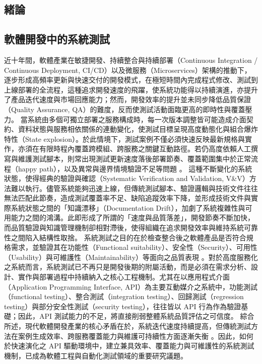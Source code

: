 \begin{ZhChapter}

\chapter{緒論}

\section{軟體開發中的系統測試}
\text 近十年間，軟體產業在敏捷開發、持續整合與持續部署（Continuous Integration / Continuous Deployment, CI/CD）以及微服務（Microservices）架構的推動下，逐步形成高頻率更新與快速交付的開發模式，在極短時間內完成程式修改、測試到上線部署的全流程，這種追求開發速度的飛躍，使系統功能得以持續演進，亦提升了產品迭代速度與市場回應能力\parencite{Bajaj2019SystematicReviewTCP}；然而，開發效率的提升並未同步降低品質保證（Quality Assurance, QA）的難度，反而使測試活動面臨更高的即時性與覆蓋壓力。
\text 當系統由多個可獨立部署之服務構成時，每一次版本調整皆可能造成介面契約、資料狀態與服務相依關係的連動變化，使測試目標呈現高度動態化與組合爆炸特性（State explosion）。於此情境下，測試案例不僅必須快速反映最新規格與實作，亦須在有限時程內覆蓋跨模組、跨服務之關鍵互動路徑。若仍高度依賴人工撰寫與維護測試腳本，則常出現測試更新速度落後部署節奏、覆蓋範圍集中於正常流程（happy path），以及異常與邊界情境驗證不足等問題 \parencite{Bajaj2019SystematicReviewTCP}。
\text 這種不斷變化的系統狀態，使得經典的驗證與確認（Systematic Verification and Validation, V\&V）方法難以執行。儘管系統能夠迅速上線，但傳統測試腳本、驗證邏輯與技術文件往往無法匹配此節奏，造成測試覆蓋率不足、缺陷追蹤效率下降，並形成技術文件與實際系統狀態之間的「知識漂移」（Documentation Drift），加劇了系統複雜性與可用能力之間的鴻溝。此即形成了所謂的「速度與品質落差」，開發節奏不斷加快，而品質驗證與知識管理機制卻相對滯後，使得組織在追求開發效率與維持系統可靠性之間陷入結構性取捨。
\text 系統測試之目的在於檢查整合後之軟體產品是否符合規格需求，並驗證其在功能性（Functional suitability）、安全性（Security）、可用性（Usability）與可維護性（Maintainability）等面向之品質表現 \parencite{TestingSoftwareSystems}。對於高度服務化之系統而言，系統測試已不再只是開發後期的附屬活動，而是必須在需求分析、設計、實作與部署過程中持續納入之核心工程機制。尤其在以應用程式介面（Application Programming Interface, API）為主要互動媒介之系統中，功能測試（functional testing）、整合測試（integration testing）、回歸測試（regression testing）與部分安全性測試（security testing），往往皆以 API 行為作為驗證基礎；因此，API 測試能力的不足，將直接削弱整體系統品質評估之可信度。
\text 綜合所述，現代軟體開發產業的核心矛盾在於，系統迭代速度持續提高，但傳統測試方法在案例生成效率、跨服務覆蓋能力與維護可持續性方面逐漸失衡 \parencite{Bajaj2019SystematicReviewTCP, TestingSoftwareSystems}。因此，如何於快速演化之 API 驅動環境中，建立兼具效率、覆蓋能力與可維護性的系統測試機制，已成為軟體工程與自動化測試領域的重要研究議題。


\end{ZhChapter}
